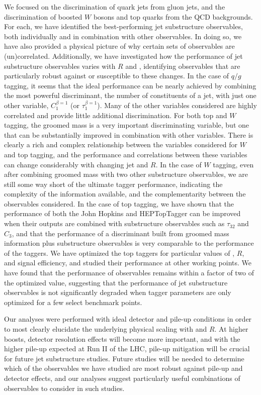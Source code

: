 We focused on the discrimination of quark jets from gluon jets, and the discrimination of boosted $W$ bosons and top quarks from the QCD backgrounds. For each, we have identified the best-performing jet substructure observables, both individually and in combination with other observables. In doing so, we have also provided a physical picture of why certain sets of observables are (un)correlated. Additionally, we have investigated how the performance of jet substructure observables varies with $R$ and \pt, identifying observables that are particularly robust against or susceptible to these changes. In the case of $q/g$ tagging, it seems that the ideal performance can be nearly achieved by combining the most powerful discriminant, the number of constituents of a jet, with just one other variable, $C_1^{\beta =1}$ (or $\tau_1^{\beta=1}$). Many of the other variables considered are highly correlated and provide little additional discrimination. For both top and $W$ tagging, the groomed mass is a very important discriminating variable, but one that can be substantially improved in combination with other variables. There is clearly a rich and complex relationship between the variables considered for $W$ and top tagging, and the performance and correlations between these variables can change considerably with changing jet \pt and $R$. In the case of $W$ tagging, even after combining groomed mass with two other substructure observables, we are still some way short of the ultimate tagger performance, indicating the complexity of the information available, and the complementarity between the observables considered. In the case of top tagging, we have shown that the performance of both the John Hopkins and HEPTopTagger can be improved when their outputs are combined with substructure observables such as $\tau_{32}$ and $C_{3}$, and that the performance of a discriminant built from groomed mass information plus substructure observables is very comparable to the performance of the taggers.  We have optimized the top taggers for particular values of \pt, $R$, and signal efficiency, and studied their performance at other working points. We have found that the performance of observables remains within a factor of two of the optimized value, suggesting that the performance of jet substructure observables is not significantly degraded when tagger parameters are only optimized for a few select benchmark points.

Our analyses were performed with ideal detector and pile-up conditions in order to most clearly elucidate the underlying physical scaling with \pt and $R$. At higher boosts, detector resolution effects will become more important, and with the higher pile-up expected at Run II of the LHC, pile-up mitigation will be crucial for future jet substructure studies. Future studies will be needed to determine which of the observables we have studied are most robust against pile-up and detector effects, and our analyses suggest particularly useful combinations of observables to consider in such studies. 

